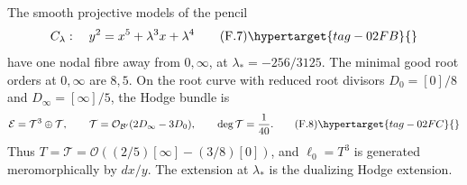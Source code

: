 \begin{theorem}\hypertarget{tag-02QV}{}\label{night:P1.4}
The smooth projective models of the pencil
\[
 C_\lambda:\quad y^2=x^5+\lambda^3x+\lambda^4
 \tag{F.7}\hypertarget{tag-02FB}{}\label{maps:eq:F.7}
\]
have one nodal fibre away from $0,\infty$, at $\lambda_*=-256/3125$.
The minimal good root orders at $0,\infty$ are $8,5$.
On the root curve with reduced root divisors $D_0=[0]/8$ and $D_\infty=[\infty]/5$, the Hodge bundle is
\[
 \mathcal E=\mathcal T^3\oplus\mathcal T,\qquad
 \mathcal T=\mathcal O_{\mathcal B'}(2D_\infty-3D_0),\qquad
 \deg\mathcal T=\frac1{40}.
 \tag{F.8}\hypertarget{tag-02FC}{}\label{maps:eq:F.8}
\]
Thus $T=\mathcal T=\mathcal O((2/5)[\infty]-(3/8)[0])$, and $\ell_0=T^3$ is generated meromorphically by $dx/y$.
The extension at $\lambda_*$ is the dualizing Hodge extension.
\end{theorem}
